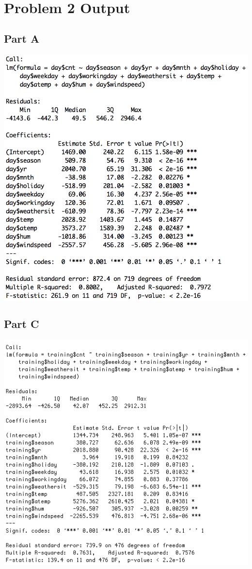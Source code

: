 \documentclass[11pt]{article}
\begin{document}
\section{Problem 2 Output}
\label{sec:problem2output}
\subsection{Part A}
\label{subsec:problem2aoutput}
\includegraphics[totalheight=0.65\textheight]{Part2Aoutput}
\subsection{Part C}
\label{subsec:problem2coutput}
\includegraphics[totalheight=0.65\textheight]{Output.jpg}
\end{document}
